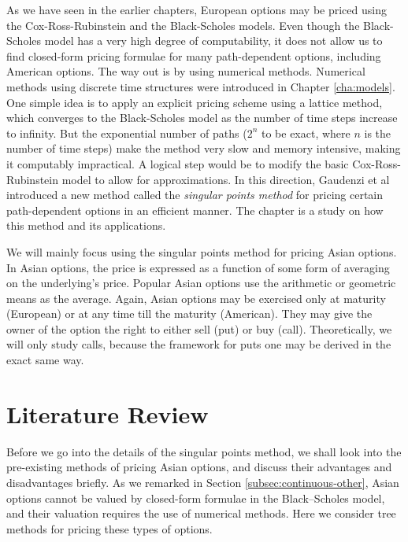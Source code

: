 

As we have seen in the earlier chapters, European options may be priced using the Cox-Ross-Rubinstein and the Black-Scholes models. Even though the Black-Scholes model has a very high degree of computability, it does not allow us to find closed-form pricing formulae for many path-dependent options, including American options. The way out is by using numerical methods. Numerical methods using discrete time structures were introduced in Chapter \ref{cha:models}. One simple idea is to apply an explicit pricing scheme using a lattice method, which converges to the Black-Scholes model as the number of time steps increase to infinity. But the exponential number of paths ($2^n$ to be exact, where $n$ is the number of time steps) make the method very slow and memory intensive, making it computably impractical. A logical step would be to modify the basic Cox-Ross-Rubinstein model to allow for approximations. In this direction, Gaudenzi et al\cite{Gaudenzi2010} introduced a new method called the \emph{singular points method} for pricing certain path-dependent options in an efficient manner. The chapter is a study on how this method and its applications.

We will mainly focus using the singular points method for pricing Asian options. In Asian options, the price is expressed as a function of some form of averaging on the underlying's price. Popular Asian options use the arithmetic or geometric means as the average. Again, Asian options may be exercised only at maturity (European) or at any time till the maturity (American). They may give the owner of the option the right to either sell (put) or buy (call). Theoretically, we will only study calls, because the framework for puts one may be derived in the exact same way.



\section{Literature Review}
\label{sec:asian-lit-review}

Before we go into the details of the singular points method, we shall look into the pre-existing methods of pricing Asian options, and discuss their advantages and disadvantages briefly. As we remarked in Section \ref{subsec:continuous-other}, Asian options cannot be valued by closed-form formulae in the Black–Scholes model, and their valuation requires the use of numerical methods. Here we consider tree methods for pricing these types of options.

